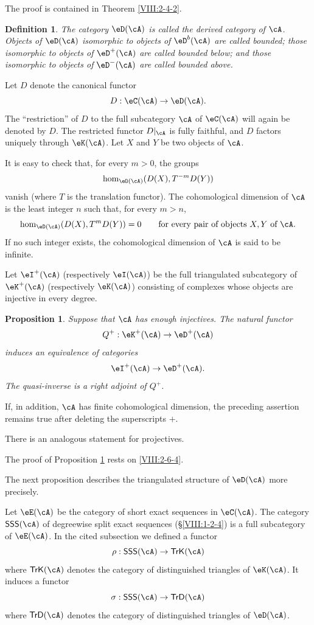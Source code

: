 \documentclass[12pt,oneside,english]{smfbook}
\newtheorem{proposition}[subsubsection]{Proposition}
\newtheorem{definition}[subsubsection]{Definition}
\begin{document}
The proof is contained in Theorem \ref{VIII:2-4-2}.

\begin{definition}\label{VIII:3-1-3}
The category $\eD(\cA)$ is called the \emph{derived category} of $\cA$. Objects of $\eD(\cA)$ isomorphic to objects of $\eD^b(\cA)$ are called \emph{bounded}; those isomorphic to objects of $\eD^+(\cA)$ are called \emph{bounded below}; and those isomorphic to objects of $\eD^-(\cA)$ are called \emph{bounded above}.
\end{definition}

Let $D$ denote the canonical functor
\[
  D : \eC(\cA) \to \eD(\cA) \text{.}
\]
The ``restriction'' of $D$ to the full subcategory $\cA$ of $\eC(\cA)$ will again be denoted by $D$. The restricted functor $D|_\cA$ is fully faithful, and $D$ factors uniquely through $\eK(\cA)$. Let $X$ and $Y$ be two objects of $\cA$.

It is easy to check that, for every $m>0$, the groups
\[
  \hom_{\eD(\cA)}(D(X),T^{-m}D(Y))
\]
vanish (where $T$ is the translation functor). The cohomological dimension of $\cA$ is the least integer $n$ such that, for every $m>n$,
\[
  \hom_{\eD(\cA)}(D(X),T^m D(Y)) = 0
  \qquad\text{for every pair of objects $X,Y$ of $\cA$.}
\]
If no such integer exists, the cohomological dimension of $\cA$ is said to be infinite.

Let $\eI^+(\cA)$ (respectively $\eI(\cA)$) be the full triangulated subcategory of $\eK^+(\cA)$ (respectively $\eK(\cA)$) consisting of complexes whose objects are injective in every degree.

\begin{proposition}\label{VIII:3-1-4}
Suppose that $\cA$ has enough injectives. The natural functor
\[
  Q^+:\eK^+(\cA) \to \eD^+(\cA)
\]
induces an equivalence of categories
\[
  \eI^+(\cA) \to \eD^+(\cA)  \text{.}
\]
The quasi-inverse is a right adjoint of $Q^+$.
\end{proposition}

If, in addition, $\cA$ has finite cohomological dimension, the preceding assertion remains true after deleting the superscripts $+$.

There is an analogous statement for projectives.

The proof of Proposition \ref{VIII:3-1-4} rests on \ref{VIII:2-6-4}.

The next proposition describes the triangulated structure of $\eD(\cA)$ more precisely.

Let $\eE(\cA)$ be the category of short exact sequences in $\eC(\cA)$. The category $\mathsf{SSS}(\cA)$ of degreewise split exact sequences (\S\ref{VIII:1-2-4}) is a full subcategory of $\eE(\cA)$. In the cited subsection we defined a functor
\[
  \rho:\mathsf{SSS}(\cA) \to \mathsf{TrK}(\cA)
\]
where $\mathsf{TrK}(\cA)$ denotes the category of distinguished triangles of $\eK(\cA)$. It induces a functor
\[
  \sigma : \mathsf{SSS}(\cA) \to \mathsf{TrD}(\cA)
\]
where $\mathsf{TrD}(\cA)$ denotes the category of distinguished triangles of $\eD(\cA)$.
\end{document}
